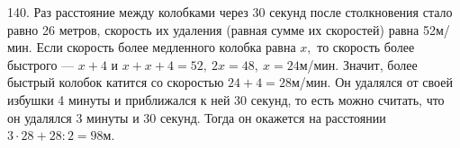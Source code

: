 140. Раз расстояние между колобками через 30 секунд после столкновения стало равно 26 метров, скорость их удаления (равная сумме их скоростей) равна 52м/мин. Если скорость более медленного колобка равна $x,$ то скорость более быстрого --- $x+4$ и $x+x+4=52,\ 2x=48,\ x=24$м/мин. Значит, более быстрый колобок катится со скоростью $24+4=28$м/мин. Он удалялся от своей избушки 4 минуты и приближался к ней 30 секунд, то есть можно считать, что он удалялся 3 минуты и 30 секунд. Тогда он окажется на расстоянии $3\cdot28+28:2=98$м.\\
